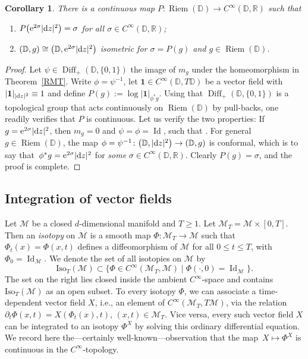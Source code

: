 \documentclass[10pt,a4paper]{amsart}
\numberwithin{equation}{section}
\newtheorem{Corollary}[Theorem]{Corollary}
\theoremstyle{definition}
\newcommand{\R}{\mathbb{R}} %
\newcommand{\DD}{\mathbb{D}} %
\newcommand{\1}{{\bf 1}}
\newcommand{\Id}{\operatorname{Id}}
\DeclareMathOperator{\Diff}{Diff}
\DeclareMathOperator{\Riem}{Riem}
\begin{document}
\begin{Corollary}\label{cor_rmt}
There is a continuous map $P\colon \Riem(\DD)\rightarrow C^\infty(\DD,\R)$ such that
\begin{enumerate}[label=\rm(\roman*)]\itemsep=0pt
	\item $P\bigl({\rm e}^{2\sigma}|{\rm d}z|^2\bigr)=\sigma$ for all $\sigma\in C^\infty(\DD,\R)$;
	
	\item $(\DD,g) \cong \bigl(\DD,{\rm e}^{2\sigma}|{\rm d}z|^2\bigr)$ isometric for $\sigma=P(g)$ and $g\in \Riem(\DD)$.
\end{enumerate}
\end{Corollary}

\begin{proof}
Let $\psi \in \Diff_+(\DD,\{0,1\})$ the image of $m_g$ under the homeomorphism in Theorem~\ref{RMT}. Write $\phi=\psi^{-1}$, let $\mathbf 1\in C^\infty(\DD,T\DD)$ be a vector field with $|\mathbf 1|_{|{\rm d}z|^2}\equiv 1$ and define
$
	P(g) := \log |\mathbf 1|_{\phi^*g}.
$ Using that $\Diff_+(\DD,\{0,1\})$ is a topological group that acts continuously on $\Riem(\DD)$ by pull-backs, one readily verifies that $P$ is continuous.
Let us verify the two properties: If~${g={\rm e}^{2\sigma}|{\rm d}z|^2}$, then $m_g=0$ and $\psi=\phi=\Id$, such that . For general $g\in \Riem(\DD)$, the map $\phi=\psi^{-1}\colon \bigl(\DD,|{\rm d}z|^2\bigr) \rightarrow (\DD,g)$ is conformal, which is to say that~${\phi^*g={\rm e}^{2\sigma}|{\rm d}z|^2}$ for {\it some} $\sigma\in C^\infty(\DD,\R)$. Clearly $P(g)=\sigma$, and the proof is complete.
\end{proof}


\subsection{Integration of vector fields} Let $\mathcal M$ be a closed $d$-dimensional manifold and $T\ge 1$. Let $\mathcal M_T=\mathcal M\times [0,T]$. Then an {\it isotopy} on $\mathcal M$ is a smooth map $\Phi\colon \mathcal M_T\rightarrow \mathcal M$
such that $\Phi_t(x)=\Phi(x,t)$ defines a diffeomorphism of $\mathcal M$ for all $0\le t \le T$, with $\Phi_0=\operatorname{Id}_\mathcal M$. We denote the set of all isotopies on $\mathcal M$ by
\[
	\mathrm{Iso}_T(\mathcal M) \subset \{\Phi\in C^\infty(\mathcal M_T,\mathcal M)\mid \Phi(\cdot,0)=\Id_\mathcal M\}.
\]
The set on the right lies closed inside the ambient $C^\infty$-space and contains $\mathrm{Iso}_T(\mathcal M)$ as an open subset.
To every isotopy $\Phi$, we can associate a time-dependent vector field $X$, i.e., an element of $C^\infty(\mathcal M_T,T\mathcal M)$, via the relation
$\partial_t \Phi(x,t) = X(\Phi_t(x),t)$, $ (x,t)\in \mathcal M_T$.
Vice versa, every such vector field $X$ can be integrated to an isotopy $\Phi^X$ by solving this ordinary differential equation. We record here the---certainly well-known---observation that the map~${X\mapsto \Phi^X}$ is continuous in the $C^\infty$-topology.
\end{document}
